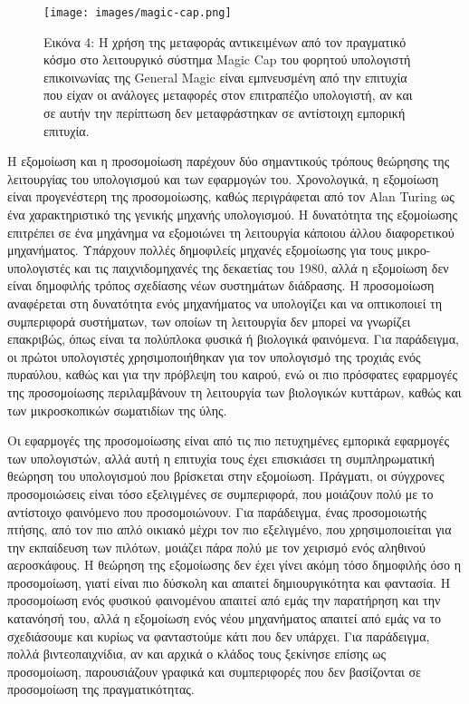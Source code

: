 \documentclass[
]{article}
\begin{document}
\leavevmode{}%
\begin{figure}
\hypertarget{fig:magic-cap}{%
\centering
\texttt{[image: images/magic-cap.png]}
\caption{Εικόνα 4: Η χρήση της μεταφοράς αντικειμένων από τον πραγματικό
κόσμο στο λειτουργικό σύστημα Magic Cap του φορητού υπολογιστή
επικοινωνίας της General Magic είναι εμπνευσμένη από την επιτυχία που
είχαν οι ανάλογες μεταφορές στον επιτραπέζιο υπολογιστή, αν και σε αυτήν
την περίπτωση δεν μεταφράστηκαν σε αντίστοιχη εμπορική
επιτυχία.}\label{fig:magic-cap}
}
\end{figure}

Η εξομοίωση και η προσομοίωση παρέχουν δύο σημαντικούς τρόπους θεώρησης
της λειτουργίας του υπολογισμού και των εφαρμογών του. Χρονολογικά, η
εξομοίωση είναι προγενέστερη της προσομοίωσης, καθώς περιγράφεται από
τον Alan Turing ως ένα χαρακτηριστικό της γενικής μηχανής υπολογισμού. Η
δυνατότητα της εξομοίωσης επιτρέπει σε ένα μηχάνημα να εξομοιώνει τη
λειτουργία κάποιου άλλου διαφορετικού μηχανήματος. Υπάρχουν πολλές
δημοφιλείς μηχανές εξομοίωσης για τους μικρο-υπολογιστές και τις
παιχνιδομηχανές της δεκαετίας του 1980, αλλά η εξομοίωση δεν είναι
δημοφιλής τρόπος σχεδίασης νέων συστημάτων διάδρασης. Η προσομοίωση
αναφέρεται στη δυνατότητα ενός μηχανήματος να υπολογίζει και να
οπτικοποιεί τη συμπεριφορά συστήματων, των οποίων τη λειτουργία δεν
μπορεί να γνωρίζει επακριβώς, όπως είναι τα πολύπλοκα φυσικά ή βιολογικά
φαινόμενα. Για παράδειγμα, οι πρώτοι υπολογιστές χρησιμοποιήθηκαν για
τον υπολογισμό της τροχιάς ενός πυραύλου, καθώς και για την πρόβλεψη του
καιρού, ενώ οι πιο πρόσφατες εφαρμογές της προσομοίωσης περιλαμβάνουν τη
λειτουργία των βιολογικών κυττάρων, καθώς και των μικροσκοπικών
σωματιδίων της ύλης.

Οι εφαρμογές της προσομοίωσης είναι από τις πιο πετυχημένες εμπορικά
εφαρμογές των υπολογιστών, αλλά αυτή η επιτυχία τους έχει επισκιάσει τη
συμπληρωματική θεώρηση του υπολογισμού που βρίσκεται στην εξομοίωση.
Πράγματι, οι σύγχρονες προσομοιώσεις είναι τόσο εξελιγμένες σε
συμπεριφορά, που μοιάζουν πολύ με το αντίστοιχο φαινόμενο που
προσομοιώνουν. Για παράδειγμα, ένας προσομοιωτής πτήσης, από τον πιο
απλό οικιακό μέχρι τον πιο εξελιγμένο, που χρησιμοποιείται για την
εκπαίδευση των πιλότων, μοιάζει πάρα πολύ με τον χειρισμό ενός αληθινού
αεροσκάφους. H θεώρηση της εξομοίωσης δεν έχει γίνει ακόμη τόσο
δημοφιλής όσο η προσομοίωση, γιατί είναι πιο δύσκολη και απαιτεί
δημιουργικότητα και φαντασία. Η προσομοίωση ενός φυσικού φαινομένου
απαιτεί από εμάς την παρατήρηση και την κατανόησή του, αλλά η εξομοίωση
ενός νέου μηχανήματος απαιτεί από εμάς να το σχεδιάσουμε και κυρίως να
φανταστούμε κάτι που δεν υπάρχει. Για παράδειγμα, πολλά βιντεοπαιχνίδια,
αν και αρχικά ο κλάδος τους ξεκίνησε επίσης ως προσομοίωση, παρουσιάζουν
γραφικά και συμπεριφορές που δεν βασίζονται σε προσομοίωση της
πραγματικότητας.
\end{document}
